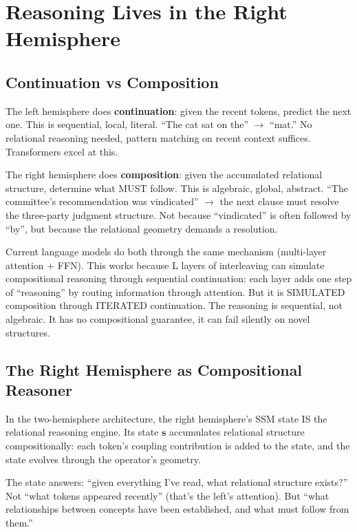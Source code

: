 \documentclass[11pt, a4paper]{article}
\theoremstyle{plain}
\theoremstyle{definition}
\theoremstyle{remark}
\begin{document}
\section{Reasoning Lives in the Right Hemisphere}
\label{sec:reasoning}

\subsection{Continuation vs Composition}

The left hemisphere does \textbf{continuation}: given the recent tokens, predict the next one.
This is sequential, local, literal.
``The cat sat on the'' $\to$ ``mat.''
No relational reasoning needed, pattern matching on recent context suffices.
Transformers excel at this.

The right hemisphere does \textbf{composition}: given the accumulated relational structure, determine what MUST follow.
This is algebraic, global, abstract.
``The committee's recommendation was vindicated'' $\to$ the next clause must resolve the three-party judgment structure.
Not because ``vindicated'' is often followed by ``by'', but because the relational geometry demands a resolution.

Current language models do both through the same mechanism (multi-layer attention + FFN).
This works because L layers of interleaving can simulate compositional reasoning through sequential continuation: each layer adds one step of ``reasoning'' by routing information through attention.
But it is SIMULATED composition through ITERATED continuation.
The reasoning is sequential, not algebraic.
It has no compositional guarantee, it can fail silently on novel structures.

\subsection{The Right Hemisphere as Compositional Reasoner}

In the two-hemisphere architecture, the right hemisphere's SSM state IS the relational reasoning engine.
Its state $\mathbf{s}$ accumulates relational structure compositionally: each token's coupling contribution is added to the state, and the state evolves through the operator's geometry.

The state answers: ``given everything I've read, what relational structure exists?''
Not ``what tokens appeared recently'' (that's the left's attention).
But ``what relationships between concepts have been established, and what must follow from them.''
\end{document}
